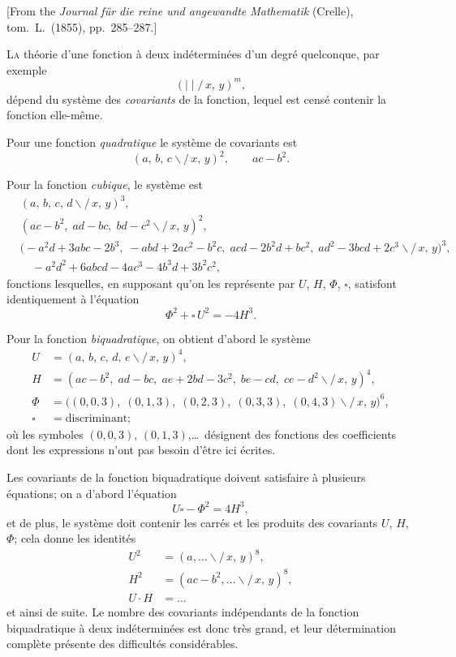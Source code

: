 \documentclass[11pt,a4paper]{article}
\theoremstyle{definition}
\begin{document}
[From the \textit{Journal f\"ur die reine und angewandte Mathematik} (Crelle),
tom.\ L.\ (1855), pp.\ 285--287.]

\medskip

\textsc{La} th\'eorie d'une fonction \`a deux ind\'etermin\'ees d'un degr\'e
quelconque, par exemple
\[
(\mid\mid\!\!\!/\,x,\, y)^m,
\]
d\'epend du syst\`eme des \textit{covariants} de la fonction, lequel est
cens\'e contenir la fonction elle-m\^eme.

Pour une fonction \textit{quadratique} le syst\`eme de covariants est
\[
(a,\, b,\, c\!\!\backslash\!\!\!/\,x,\, y)^2,\qquad ac-b^2.
\]

Pour la fonction \textit{cubique}, le syst\`eme est
\begin{align*}
&(a,\, b,\, c,\, d\!\!\backslash\!\!\!/\,x,\, y)^3, \\
&(ac-b^2,\; ad-bc,\; bd-c^2 \backslash\!\!\!/\,x,\, y)^2, \\
&\bigl(-a^2d + 3abc - 2b^3,\; -abd + 2ac^2 - b^2c,\;
acd - 2b^2d + bc^2,\; ad^2 - 3bcd + 2c^3 \backslash\!\!\!/\,x,\, y\bigr)^3, \\
&\quad -a^2d^2 + 6abcd - 4ac^3 - 4b^3d + 3b^2c^2,
\end{align*}
fonctions lesquelles, en supposant qu'on les repr\'esente par $U$, $H$,
$\Phi$, $\square$, satisfont identiquement \`a l'\'equation
\[
\Phi^2 + \square\,U^2 = -4H^3.
\]

Pour la fonction \textit{biquadratique}, on obtient d'abord le syst\`eme
\begin{align*}
U &= (a,\, b,\, c,\, d,\, e\!\!\backslash\!\!\!/\,x,\, y)^4, \\
H &= (ac-b^2,\; ad-bc,\; ae + 2bd - 3c^2,\; be-cd,\; ce-d^2
\backslash\!\!\!/\,x,\, y)^4, \\
\Phi &= \bigl( (0,0,3),\; (0,1,3),\; (0,2,3),\; (0,3,3),\;
(0,4,3) \backslash\!\!\!/\,x,\, y\bigr)^6, \\
\square &= \text{discriminant};
\end{align*}
o\`u les symboles $(0,0,3)$, $(0,1,3)$,\ldots\ d\'esignent des fonctions
des coefficients dont les expressions n'ont pas besoin d'\^etre ici
\'ecrites.

\medskip

Les covariants de la fonction biquadratique doivent satisfaire \`a
plusieurs \'equations; on a d'abord l'\'equation
\[
U\square - \Phi^2 = 4H^3,
\]
et de plus, le syst\`eme doit contenir les carr\'es et les produits des
covariants $U$, $H$, $\Phi$; cela donne les identit\'es
\begin{align*}
U^2 &= (a,\ldots \backslash\!\!\!/\,x,\, y)^8, \\
H^2 &= (ac-b^2,\ldots \backslash\!\!\!/\,x,\, y)^8, \\
U\cdot H &= \ldots
\end{align*}
et ainsi de suite. Le nombre des covariants ind\'ependants de la fonction
biquadratique \`a deux ind\'etermin\'ees est donc tr\`es grand, et leur
d\'etermination compl\`ete pr\'esente des difficult\'es consid\'erables.
\end{document}
